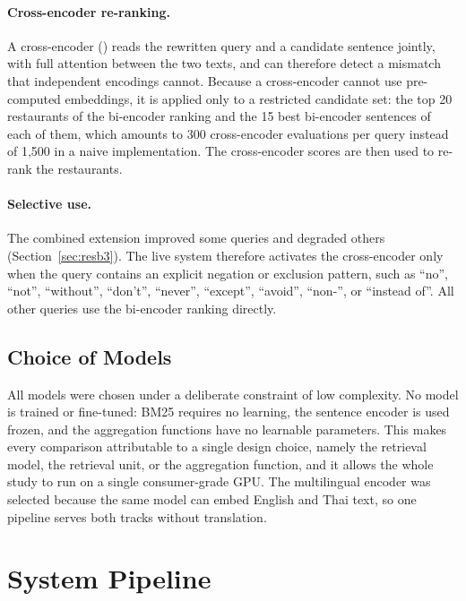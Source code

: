 \paragraph{Cross-encoder re-ranking.} A cross-encoder (\cemodel{}) reads the rewritten query and a candidate sentence jointly, with full attention between the two texts, and can therefore detect a mismatch that independent encodings cannot. Because a cross-encoder cannot use pre-computed embeddings, it is applied only to a restricted candidate set: the top 20 restaurants of the bi-encoder ranking and the 15 best bi-encoder sentences of each of them, which amounts to 300 cross-encoder evaluations per query instead of 1,500 in a naive implementation. The cross-encoder scores are then used to re-rank the restaurants.

\paragraph{Selective use.} The combined extension improved some queries and degraded others (Section~\ref{sec:resb3}). The live system therefore activates the cross-encoder only when the query contains an explicit negation or exclusion pattern, such as ``no'', ``not'', ``without'', ``don't'', ``never'', ``except'', ``avoid'', ``non-'', or ``instead of''. All other queries use the bi-encoder ranking directly.

\subsection{Choice of Models}
\label{sec:whymodels}

All models were chosen under a deliberate constraint of low complexity. No model is trained or fine-tuned: BM25 requires no learning, the sentence encoder is used frozen, and the aggregation functions have no learnable parameters. This makes every comparison attributable to a single design choice, namely the retrieval model, the retrieval unit, or the aggregation function, and it allows the whole study to run on a single consumer-grade GPU. The multilingual encoder was selected because the same model can embed English and Thai text, so one pipeline serves both tracks without translation.

\section{System Pipeline}
\label{sec:pipeline}

